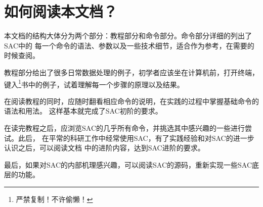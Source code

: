 \section{如何阅读本文档？}

本文档的结构大体分为两个部分：教程部分和命令部分。命令部分详细的列出了SAC中的
每一个命令的语法、参数以及一些技术细节，适合作为参考，在需要的时候查阅。

教程部分给出了很多日常数据处理的例子，初学者应该坐在计算机前，打开终端，
键入\footnote{严禁复制！不许偷懒！}书中的例子，试着理解每一个步骤的原理以及结果。

在阅读教程的同时，应随时翻看相应命令的说明，在实践的过程中掌握基础命令的语法和用法。
这样基本就完成了SAC初阶的要求。

在读完教程之后，应浏览SAC的几乎所有命令，并挑选其中感兴趣的一些进行尝试。此后，
在平常的科研工作中经常使用SAC，有了实践经验和对SAC的进一步认识之后，可以阅读文档
中的进阶内容，达到SAC进阶的要求。

最后，如果对SAC的内部机理感兴趣，可以阅读SAC的源码，重新实现一些SAC底层的功能。
